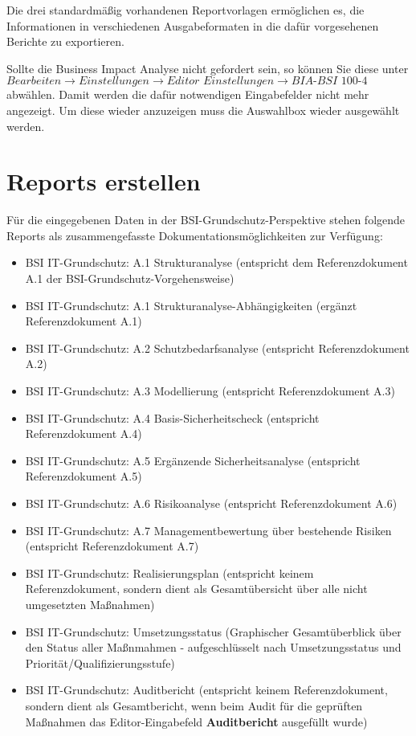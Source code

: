 \documentclass[a4paper,10pt]{book}
\begin{document}
Die drei standardmäßig vorhandenen Reportvorlagen ermöglichen es, die
Informationen in verschiedenen Ausgabeformaten in die dafür vorgesehenen
Berichte zu exportieren.

Sollte die Business Impact Analyse nicht gefordert sein, so können Sie diese
unter $\textit{Bearbeiten}\to\textit{Einstellungen}\to\textit{Editor
Einstellungen}\to\textit{BIA-BSI 100-4}$ abwählen. Damit werden die dafür
notwendigen Eingabefelder nicht mehr angezeigt. Um diese wieder anzuzeigen muss
die Auswahlbox wieder ausgewählt werden.


\section{Reports erstellen}
\label{Reports erstellen}
Für die eingegebenen Daten in der BSI-Grundschutz-Perspektive stehen folgende Reports als zusammengefasste Dokumentationsmöglichkeiten zur Verfügung:
\begin{itemize}
 \item BSI IT-Grundschutz: A.1 Strukturanalyse (entspricht dem Referenzdokument A.1 der BSI-Grundschutz-Vorgehensweise)
 \item BSI IT-Grundschutz: A.1 Strukturanalyse-Abhängigkeiten (ergänzt Referenzdokument A.1)
 \item BSI IT-Grundschutz: A.2 Schutzbedarfsanalyse (entspricht Referenzdokument A.2)
 \item BSI IT-Grundschutz: A.3 Modellierung (entspricht Referenzdokument A.3)
 \item BSI IT-Grundschutz: A.4 Basis-Sicherheitscheck (entspricht Referenzdokument A.4)
 \item BSI IT-Grundschutz: A.5 Ergänzende Sicherheitsanalyse (entspricht Referenzdokument A.5)
 \item BSI IT-Grundschutz: A.6 Risikoanalyse (entspricht Referenzdokument A.6)
 \item BSI IT-Grundschutz: A.7 Managementbewertung über bestehende Risiken (entspricht Referenzdokument A.7)
 \item BSI IT-Grundschutz: Realisierungsplan (entspricht keinem Referenzdokument, sondern dient als Gesamtübersicht über alle nicht umgesetzten Maßnahmen)
 \item BSI IT-Grundschutz: Umsetzungsstatus (Graphischer Gesamtüberblick über den Status aller Maßnmahmen - aufgeschlüsselt nach Umsetzungsstatus und Priorität/Qualifizierungsstufe)
 \item BSI IT-Grundschutz: Auditbericht (entspricht keinem Referenzdokument, sondern dient als Gesamtbericht, wenn beim Audit für die geprüften Maßnahmen das Editor-Eingabefeld \textbf{Auditbericht} ausgefüllt wurde)
\end{itemize}
\end{document}
